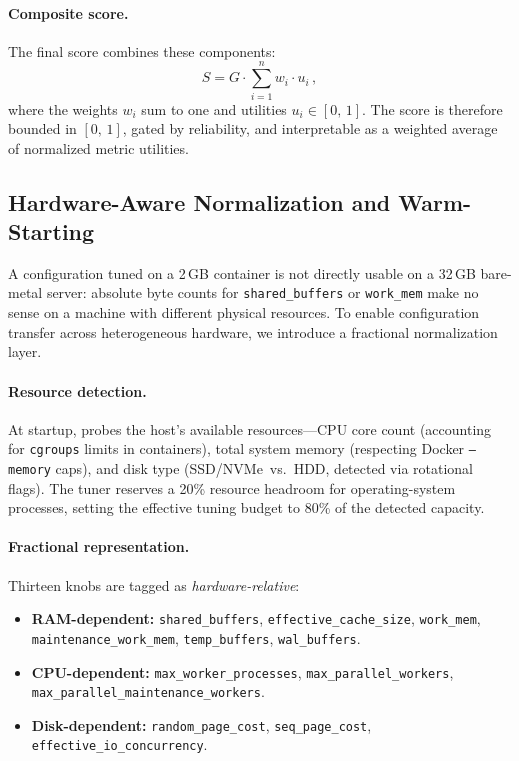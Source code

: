 \paragraph{Composite score.}
The final score combines these components:
\begin{equation}
  S = G \cdot \sum_{i=1}^{n} w_i \cdot u_i\,,
  \label{eq:score}
\end{equation}
where the weights $w_i$ sum to one and utilities $u_i \in [0,\,1]$.  The
score is therefore bounded in $[0,\,1]$, gated by reliability, and
interpretable as a weighted average of normalized metric utilities.

\subsection{Hardware-Aware Normalization and Warm-Starting}
\label{ssec:hardware-transfer}

A configuration tuned on a 2\,GB container is not directly usable on a
32\,GB bare-metal server: absolute byte counts for
\texttt{shared\_buffers} or \texttt{work\_mem} make no sense on a machine
with different physical resources.  To enable configuration transfer across
heterogeneous hardware, we introduce a fractional normalization layer.

\paragraph{Resource detection.}
At startup, \sysname probes the host's available resources---CPU core count
(accounting for \texttt{cgroups} limits in containers), total system memory
(respecting Docker \texttt{--memory} caps), and disk type
(SSD/NVMe~vs.~HDD, detected via rotational flags).  The tuner reserves a 20\%
resource headroom for operating-system processes, setting the effective tuning
budget to 80\% of the detected capacity.

\paragraph{Fractional representation.}
Thirteen knobs are tagged as \emph{hardware-relative}:

\begin{itemize}
  \item \textbf{RAM-dependent:} \texttt{shared\_buffers},
    \texttt{effective\_cache\_size}, \texttt{work\_mem},
    \texttt{maintenance\_work\_mem}, \texttt{temp\_buffers},
    \texttt{wal\_buffers}.
  \item \textbf{CPU-dependent:} \texttt{max\_worker\_processes},
    \texttt{max\_parallel\_workers},
    \texttt{max\_parallel\_maintenance\_workers}.
  \item \textbf{Disk-dependent:} \texttt{random\_page\_cost},
    \texttt{seq\_page\_cost}, \texttt{effective\_io\_concurrency}.
\end{itemize}

